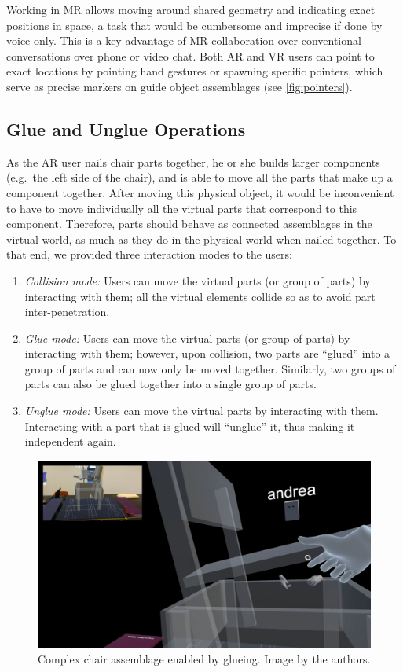 \documentclass[10pt,twocolumn,letterpaper,english]{article}
\begin{document}
Working in MR allows moving around shared geometry and indicating exact positions in space, a task that would be cumbersome and imprecise if done by voice only. This is a key advantage of MR collaboration over conventional conversations over phone or video chat. Both AR and VR users can point to exact locations by pointing hand gestures or spawning specific pointers, which serve as precise markers on guide object assemblages (see \cref{fig:pointers}).

\subsection{Glue and Unglue Operations}

As the AR user nails chair parts together, he or she builds larger components (e.g.\ the left side of the chair), and is able to move all the parts that make up a component together. After moving this physical object, it would be inconvenient to have to move individually all the virtual parts that correspond to this component. Therefore, parts should behave as connected assemblages in the virtual world, as much as they do in the physical world when nailed together. To that end, we provided three interaction modes to the users:

\begin{enumerate}
    \item \emph{Collision mode:} Users can move the virtual parts (or group of parts) by interacting with them; all the virtual elements collide so as to avoid part inter-penetration.
    \item \emph{Glue mode:} Users can move the virtual parts (or group of parts) by interacting with them; however, upon collision, two parts are ``glued'' into a group of parts and can now only be moved together. Similarly, two groups of parts can also be glued together into a single group of parts.
    \item \emph{Unglue mode:} Users can move the virtual parts by interacting with them. Interacting with a part that is glued will ``unglue'' it, thus making it independent again.
\end{enumerate}

\begin{figure}[!htp]
    \centering
    \includegraphics[width=1\linewidth]{Complex.jpg}
    \caption{Complex chair assemblage enabled by glueing. Image by the authors.}
    \label{fig:Glue}
\end{figure}
\end{document}
